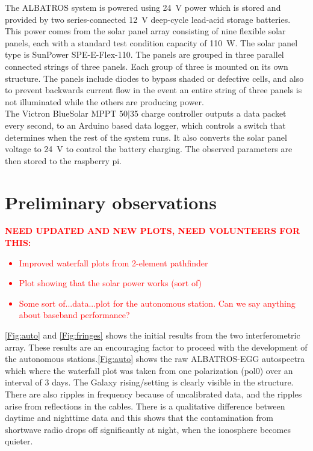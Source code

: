\documentclass{ws-jai}
\begin{document}
{The ALBATROS system is powered using \SI{24}{\volt} power which is stored and provided by two series-connected \SI{12}{\volt} deep-cycle lead-acid storage batteries. This power comes from the solar panel array consisting of nine flexible solar panels, each with a standard test condition capacity of \SI{110}{\watt}. The solar panel type is SunPower SPE-E-Flex-110. The panels are grouped in three parallel connected strings of three panels. Each group of three is mounted on its own structure. The panels include diodes to bypass shaded or defective cells, and also to prevent backwards current flow in the event an entire string of three panels is not illuminated while the others are producing power. \\

The Victron BlueSolar MPPT 50$\vert$35 charge controller outputs a data packet every second, to an Arduino based data logger, which controls a switch that determines when the rest of the system runs. It also converts the solar panel voltage to \SI{24}{\volt} to control the battery charging. The observed parameters are then stored to the raspberry pi.

\section{Preliminary observations}

\textcolor{red}{\bf NEED UPDATED AND NEW PLOTS, NEED VOLUNTEERS FOR THIS:
  \begin{itemize}
    \item{Improved waterfall plots from 2-element pathfinder}
    \item{Plot showing that the solar power works (sort of)}
    \item{Some sort of...data...plot for the autonomous station.  Can
      we say anything about baseband performance?}
  \end{itemize}
}
 
\autoref{Fig:auto} and \autoref{Fig:fringes} shows the initial results from the two interferometric array. These results are an encouraging factor to proceed with the development of the autonomous stations.\autoref{Fig:auto} shows the raw ALBATROS-EGG autospectra which where the waterfall plot was taken from one polarization (pol0) over an interval of 3 days. The Galaxy rising/setting is clearly visible in the structure. There are also ripples in frequency because of uncalibrated data, and the ripples arise from reflections in the cables. There is a qualitative difference between daytime and nighttime data and this shows that the contamination from shortwave radio drops off significantly at night, when the ionosphere becomes quieter.

}
\end{document}
